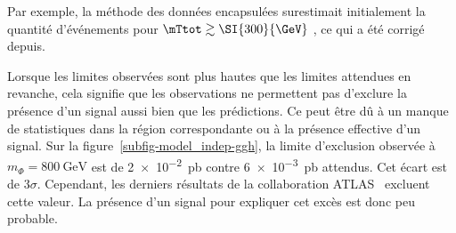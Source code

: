 Par exemple, la méthode des données encapsulées surestimait initialement la quantité d'événements
pour $\mTtot \gtrsim \SI{300}{\GeV}$ \cite{Gael_thesis}, ce qui a été corrigé depuis.
\par
Lorsque les limites observées sont plus hautes que les limites attendues en revanche,
cela signifie que les observations ne permettent pas d'exclure la présence d'un signal
aussi bien que les prédictions.
Ce peut être dû à un manque de statistiques dans la région correspondante
ou
à la présence effective d'un signal.
Sur la figure~\ref{subfig-model_indep-ggh},
la limite d'exclusion observée à $m_{\Phi}=\SI{800}{\GeV}$ est de
\SI{2e-2}{\pico\barn}
contre
\SI{6e-3}{\pico\barn} attendus.
Cet écart est de $3\sigma$.
Cependant, les derniers résultats de la collaboration ATLAS~\cite{ATLAS-MSSM-HTT_2020} excluent cette valeur.
La présence d'un signal pour expliquer cet excès est donc peu probable.

